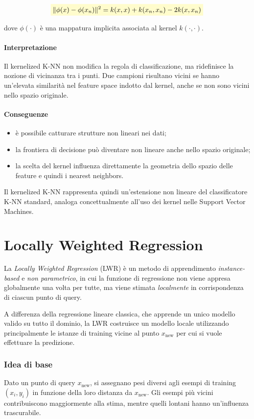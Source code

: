\documentclass[a4paper,12pt]{report}
\newcommand{\highlight}[1]{%
\colorbox{yellow!20}{$\displaystyle #1$}%
}
\begin{document}
\[
\highlight{
\|\phi(x) - \phi(x_n)\|^2
= k(x,x) + k(x_n,x_n) - 2k(x,x_n)}
\]
  
dove $\phi(\cdot)$ è una mappatura implicita associata al kernel $k(\cdot,\cdot)$.

\paragraph{Interpretazione}
Il kernelized K-NN non modifica la regola di classificazione, ma ridefinisce la nozione di vicinanza tra i punti.  
Due campioni risultano vicini se hanno un’elevata similarità nel feature space indotto dal kernel, anche se non sono vicini nello spazio originale.

\paragraph{Conseguenze}
\begin{itemize}
    \item è possibile catturare strutture non lineari nei dati;
    \item la frontiera di decisione può diventare non lineare anche nello spazio originale;
    \item la scelta del kernel influenza direttamente la geometria dello spazio delle feature e quindi i nearest neighbors.
\end{itemize}

Il kernelized K-NN rappresenta quindi un’estensione non lineare del classificatore K-NN standard, analoga concettualmente all’uso dei kernel nelle Support Vector Machines.

\section{Locally Weighted Regression}

La \emph{Locally Weighted Regression} (LWR) è un metodo di apprendimento
\emph{instance-based} e \emph{non parametrico}, in cui la funzione di regressione
non viene appresa globalmente una volta per tutte, ma viene stimata \emph{localmente}
in corrispondenza di ciascun punto di query.

A differenza della regressione lineare classica, che apprende un unico modello
valido su tutto il dominio, la LWR costruisce un modello locale utilizzando
principalmente le istanze di training vicine al punto $x_{\text{new}}$ per cui si
vuole effettuare la predizione.

\subsubsection{Idea di base}
Dato un punto di query $x_{\text{new}}$, si assegnano pesi diversi agli esempi
di training $(x_i, y_i)$ in funzione della loro distanza da $x_{\text{new}}$.
Gli esempi più vicini contribuiscono maggiormente alla stima, mentre quelli
lontani hanno un’influenza trascurabile.
\end{document}
